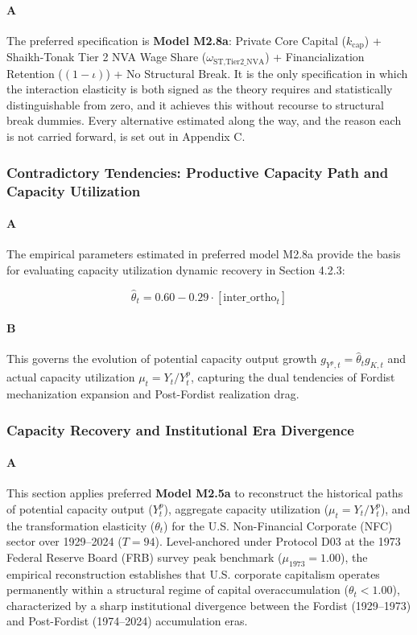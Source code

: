 \paragraph{A}
The preferred specification is \textbf{Model M2.8a}: Private Core Capital ($k_{\text{cap}}$) + Shaikh-Tonak Tier 2 NVA Wage Share ($\omega_{\text{ST,Tier2\_NVA}}$) + Financialization Retention ($(1-\iota)$) + No Structural Break. It is the only specification in which the interaction elasticity is both signed as the theory requires and statistically distinguishable from zero, and it achieves this without recourse to structural break dummies. Every alternative estimated along the way, and the reason each is not carried forward, is set out in Appendix C.

\subsubsection{Contradictory Tendencies: Productive Capacity Path and Capacity Utilization}

\paragraph{A}
The empirical parameters estimated in preferred model M2.8a provide the basis for evaluating capacity utilization dynamic recovery in Section 4.2.3:

\[\hat{\theta}_t = 0.60 - 0.29 \cdot \left[ \text{inter\_ortho}_t \right]\]

\paragraph{B}
This governs the evolution of potential capacity output growth $g_{Y^p,t} = \hat{\theta}_t g_{K,t}$ and actual capacity utilization $\mu_t = Y_t / Y_t^p$, capturing the dual tendencies of Fordist mechanization expansion and Post-Fordist realization drag.

\subsubsection{Capacity Recovery and Institutional Era Divergence}

\paragraph{A}
This section applies preferred \textbf{Model M2.5a} to reconstruct the historical paths of potential capacity output ($Y_t^p$), aggregate capacity utilization ($\mu_t = Y_t / Y_t^p$), and the transformation elasticity ($\theta_t$) for the U.S. Non-Financial Corporate (NFC) sector over 1929–2024 ($T = 94$). Level-anchored under Protocol D03 at the 1973 Federal Reserve Board (FRB) survey peak benchmark ($\mu_{1973} = 1.00$), the empirical reconstruction establishes that U.S. corporate capitalism operates permanently within a structural regime of capital overaccumulation ($\theta_t < 1.00$), characterized by a sharp institutional divergence between the Fordist (1929–1973) and Post-Fordist (1974–2024) accumulation eras.

